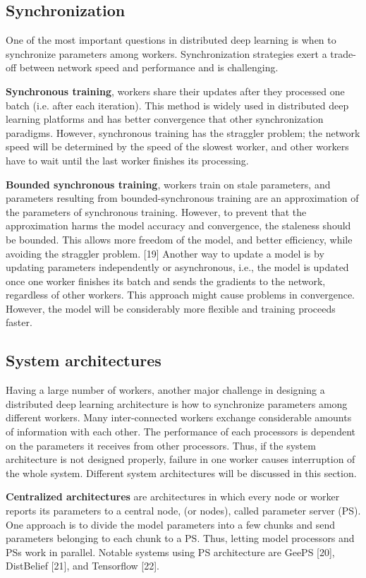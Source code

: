 \subsection{Synchronization }
One of the most important questions in distributed deep learning is when to synchronize parameters among workers. Synchronization strategies exert a trade-off between network speed and performance and is challenging.


\textbf{Synchronous training}, workers share their updates after they processed one batch (i.e. after each iteration). This method is widely used in distributed deep learning platforms and has better convergence that other synchronization paradigms. However, synchronous training has the straggler problem; the network speed will be determined by the speed of the slowest worker, and other workers have to wait until the last worker finishes its processing.


\textbf{Bounded synchronous training}, workers train on stale parameters, and parameters resulting from bounded-synchronous training are an approximation of the parameters of synchronous training. However, to prevent that the approximation harms the model accuracy and convergence, the staleness should be bounded. This allows more freedom of the model, and better efficiency, while avoiding the straggler problem. [19]
Another way to update a model is by updating parameters independently or asynchronous, i.e., the model is updated once one worker finishes its batch and sends the gradients to the network, regardless of other workers. This approach might cause problems in convergence. However, the model will be considerably more flexible and training proceeds faster.

\subsection{System architectures }
Having a large number of workers, another major challenge in designing a distributed deep learning architecture is how to synchronize parameters among different workers. Many inter-connected workers exchange considerable amounts of information with each other. The performance of each processors is dependent on the parameters it receives from other processors. Thus, if the system architecture is not designed properly, failure in one worker causes interruption of the whole system. Different system architectures will be discussed in this section.


\textbf{Centralized architectures} are architectures in which every node or worker reports its parameters to a central node, (or nodes), called parameter server (PS). One approach is to divide the model parameters into a few chunks and send parameters belonging to each chunk to a PS. Thus, letting model processors and PSs work in parallel. Notable systems using PS architecture are GeePS [20], DistBelief [21], and Tensorflow [22].


